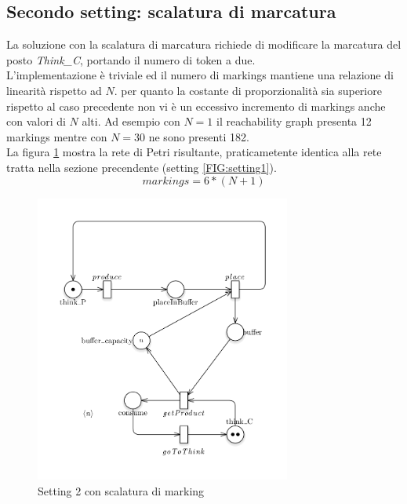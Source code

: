 \documentclass{article}
\begin{document}
\subsection{Secondo  setting: scalatura di marcatura}\label{SEC:secondo-marking}
La soluzione con la scalatura di marcatura richiede di modificare la marcatura del posto \emph{Think\_C}, portando il numero di token a due.\\
L'implementazione è triviale ed il numero di markings mantiene una relazione di linearità rispetto ad $N$. per quanto la costante di proporzionalità sia superiore rispetto al caso precedente non vi è un eccessivo incremento di markings anche con valori di $N$ alti. Ad esempio con $N = 1$ il reachability graph presenta 12 markings mentre con $N = 30$ ne sono presenti 182.\\
La figura \ref{FIG:setting2_markdown} mostra la rete di Petri risultante, praticametente identica alla rete tratta nella sezione precendente (setting \ref{FIG:setting1}). 
$$ markings = 6*(N + 1) $$
\begin{figure}[!ht]
\centering
\includegraphics[width=0.75\textwidth]{./Esercizio2_img/setting2_markdown.png}
\caption{Setting 2 con scalatura di marking} \label{FIG:setting2_markdown}
\end{figure}

\newpage
\end{document}
